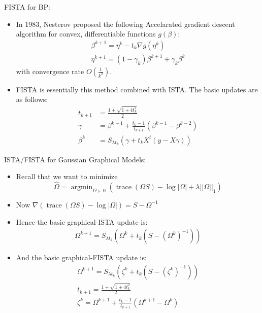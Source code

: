 \documentclass[xcolor=dvipsnames,aspectratio=1610]{beamer}
\newcommand{\norm}[1]{\left|\left|#1\right|\right|}
\DeclareMathOperator*{\trace}{trace}
\DeclareMathOperator*{\argmin}{argmin}
\theoremstyle{remark}
\begin{document}
\begin{frame}{FISTA for BP:}
  \begin{itemize}
    \setlength{\itemsep}{10pt}
\item In 1983, Nesterov proposed the following Accelarated gradient descent algorithm for convex, differentiable functions $g(\beta)$:
\begin{align*}
\beta^{k+1} = \eta^{k} - t_k \nabla g(\eta^k) \\
\eta^{k+1} = (1- \gamma_k) \beta^{k+1} + \gamma_k \beta^{k}
\end{align*}
with convergence rate $O(\frac{1}{k^2})$.
\item FISTA is essentially this method combined with ISTA. The basic updates are as follows:
\begin{align*}
t_{k+1} &= \frac{1 + \sqrt{1+4t_k^2}}{2} \\
\gamma &= \beta^{k-1} + \frac{t_k-1}{t_{k+1}} (\beta^{k-1} - \beta^{k-2}) \\
\beta^{k} &= S_{\lambda t_k} (\gamma + t_k X^t (y -
X \gamma)) 
\end{align*}
  \end{itemize}
\end{frame}

\begin{frame}{ISTA/FISTA for Gaussian Graphical Models:}
  \begin{itemize}
    \setlength{\itemsep}{10pt}
\item Recall that we want to minimize
\begin{equation*} 
\hat{\Omega} = \argmin_{\Omega \succ 0} (\trace (\Omega S)-\log |\Omega| + \lambda \norm{\Omega}_1)
\end{equation*}
\item Now $\nabla (\trace (\Omega S)-\log |\Omega|) = S - \Omega^{-1}$ 
\item Hence the basic graphical-ISTA update is:
\begin{align*}
\Omega^{k+1} = S_{\lambda t_k}(\Omega^{k} + t_k (S - (\Omega^{k})^{-1}))
\end{align*}
\item And the basic graphical-FISTA update is:
\begin{align*}
\Omega^{k+1} = S_{\lambda t_k}(\zeta^{k} + t_k (S-(\zeta^{k})^{-1})) \\
t_{k+1} = \frac{1 + \sqrt{1+4t_k^2}}{2}\\
\zeta^{k} = \Omega^{k+1} + \frac{t_k-1}{t_{k+1}}(\Omega^{k+1}  - \Omega^{k} )
\end{align*}
  \end{itemize}
\end{frame}
\end{document}
